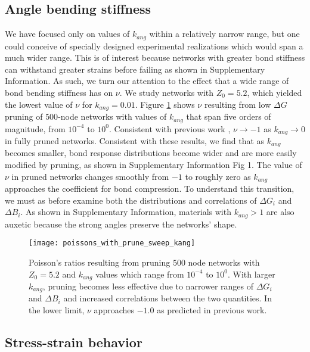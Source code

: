 \documentclass[9pt,twocolumn,twoside]{pnas-new}
\begin{document}
\subsection*{Angle bending stiffness}
We have focused only on values of $k_{ang}$ within a relatively narrow range, but one could conceive of specially designed experimental realizations which would span a much wider range.  This is of interest because networks with greater bond stiffness can withstand greater strains before failing as shown in Supplementary Information. As such, we turn our attention to the effect that a wide range of bond bending stiffness has on $\nu$.  We study networks with $Z_{0}=5.2$, which yielded the lowest value of $\nu$ for $k_{ang}=0.01$.  Figure \ref{fig:sweep_kang} shows $\nu$ resulting from low $\Delta G$ pruning of $500$-node networks with values of $k_{ang}$ that span five orders of magnitude, from $10^{-4}$ to $10^{0}$.  Consistent with previous work \cite{goodrich2015principle}, $\nu \rightarrow -1$ as $k_{ang} \rightarrow 0$ in fully pruned networks. Consistent with these results, we find that as $k_{ang}$ becomes smaller, bond response distributions become wider and are more easily modified by pruning, as shown in Supplementary Information Fig 1.  The value of $\nu$ in pruned networks changes smoothly from $-1$ to roughly zero as $k_{ang}$ approaches the coefficient for bond compression.  To understand this transition, we must as before examine both the distributions and correlations of $\Delta G_{i}$ and $\Delta B_{i}$.    As shown in Supplementary Information, materials with  $k_{ang}>1$ are also auxetic because the strong angles preserve the networks' shape.   

\begin{figure}
	\centering
	\texttt{[image: poissons\_with\_prune\_sweep\_kang]}
	\caption{Poisson's ratios resulting from pruning $500$ node networks with $Z_{0}=5.2$ and $k_{ang}$ values which range from $10^{-4}$ to $10^{0}$.  With larger $k_{ang}$, pruning becomes less effective due to narrower ranges of $\Delta G_{i}$ and $\Delta B_{i}$ and increased correlations between the two quantities.  In the lower limit, $\nu$ approaches $-1.0$ as predicted in previous work\cite{goodrich2015principle}.  }
	\label{fig:sweep_kang}
\end{figure}


\subsection*{Stress-strain behavior}
\end{document}
